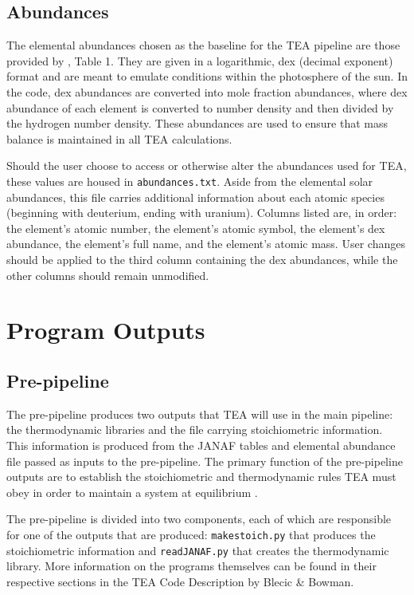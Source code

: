 {%
\subsection{Abundances}
\label{AbunSec}
The elemental abundances chosen as the baseline for the TEA pipeline
are those provided by \citet{AsplundEtal2009-SunAbundances}, Table 1.
They are given in a logarithmic, dex (decimal exponent) format and are
meant to emulate conditions within the photosphere of the sun. In the
code, dex abundances are converted into mole fraction abundances,
where dex abundance of each element is converted to number density and
then divided by the hydrogen number density. These abundances are used
to ensure that mass balance is maintained in all TEA calculations.

Should the user choose to access or otherwise alter the abundances
used for TEA, these values are housed in \texttt{abundances.txt}.
Aside from the elemental solar abundances, this file carries
additional information about each atomic species (beginning with
deuterium, ending with uranium).  Columns listed are, in order: the
element's atomic number, the element's atomic symbol, the element's
dex abundance, the element's full name, and the element's atomic mass.
User changes should be applied to the third column containing the dex
abundances, while the other columns should remain unmodified.



\section{Program Outputs}
\subsection{Pre-pipeline}
\label{PrePipe}
  The pre-pipeline produces two outputs that TEA will use in the main
  pipeline: the thermodynamic libraries and the file carrying
  stoichiometric information. This information is produced from the
  JANAF tables and elemental abundance file passed as inputs to the
  pre-pipeline.  The primary function of the pre-pipeline outputs are
  to establish the stoichiometric and thermodynamic rules TEA must
  obey in order to maintain a system at
  equilibrium \citep{BlecicEtal2016-TEAtheory}.
  
  The pre-pipeline is divided into two components, each of which are
  responsible for one of the outputs that are
  produced: \texttt{makestoich.py} that produces the stoichiometric
  information and \texttt{readJANAF.py} that creates the thermodynamic
  library.  More information on the programs themselves can be found
  in their respective sections in the TEA Code Description by
  Blecic \& Bowman.
  
}
